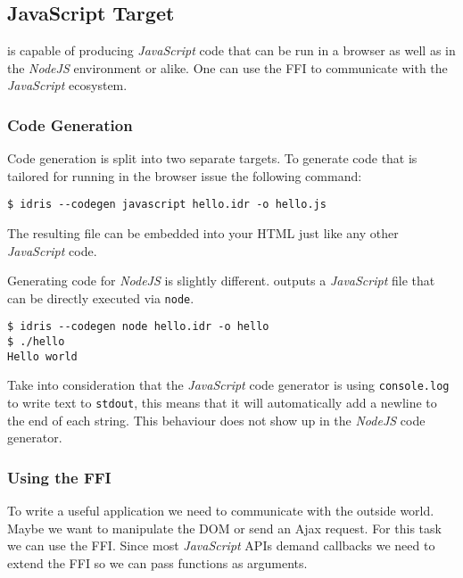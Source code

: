 \subsection{JavaScript Target}

\Idris{} is capable of producing \emph{JavaScript} code that can be run in a browser as well as in the \emph{NodeJS} environment or alike.
One can use the FFI to communicate with the \emph{JavaScript} ecosystem.

\subsubsection*{Code Generation}

\noindent
Code generation is split into two separate targets.
To generate code that is tailored for running in the browser issue the following command:

\begin{lstlisting}[style=stdout]
$ idris --codegen javascript hello.idr -o hello.js
\end{lstlisting}

\noindent
The resulting file can be embedded into your HTML just like any other \emph{JavaScript} code.

\noindent
Generating code for \emph{NodeJS} is slightly different.
\Idris{} outputs a \emph{JavaScript} file that can be directly executed via \texttt{node}.

\begin{lstlisting}[style=stdout]
$ idris --codegen node hello.idr -o hello
$ ./hello
Hello world
\end{lstlisting}

\noindent
Take into consideration that the \emph{JavaScript} code generator is using \texttt{console.log} to write text to \texttt{stdout}, this means that it will automatically add a newline to the end of each string.
This behaviour does not show up in the \emph{NodeJS} code generator.

\subsubsection*{Using the FFI}

\noindent
To write a useful application we need to communicate with the outside world.
Maybe we want to manipulate the DOM or send an Ajax request.
For this task we can use the FFI.
Since most \emph{JavaScript} APIs demand callbacks we need to extend the FFI so we can pass functions as arguments.

